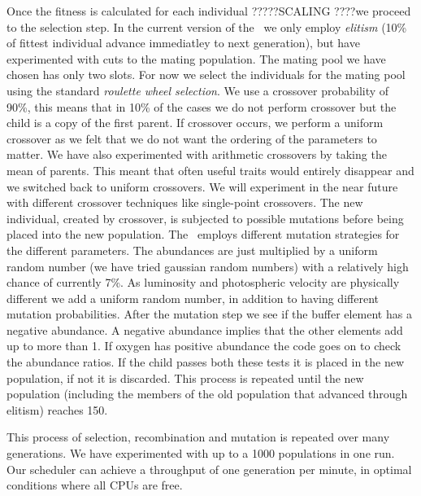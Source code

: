 Once the fitness is calculated for each individual ?????SCALING ????we proceed to the selection step. In the current version of the \dalek\ we only employ \textit{elitism} (10\% of fittest individual advance immediatley to next generation), but have experimented with cuts to the mating population. The mating pool we have chosen has only two slots. For now we select the individuals for the mating pool using the standard \textit{roulette wheel selection}. We use a crossover probability of 90\%, this means that in 10\% of the cases we do not perform crossover but the child is a copy of the first parent. If crossover occurs, we perform a uniform crossover as we felt that we do not want the ordering of the parameters to matter. We have also experimented with arithmetic crossovers by taking the mean of parents. This meant that often useful traits would entirely disappear and we switched back to uniform crossovers. We will experiment in the near future with different crossover techniques like single-point crossovers. The new individual, created by crossover, is subjected to possible mutations before being placed into the new population. The \dalek\ employs different mutation strategies for the different parameters. The abundances are just multiplied by a uniform random number (we have tried gaussian random numbers) with a relatively high chance of currently 7\%. As luminosity and photospheric velocity are physically different we add a uniform random number, in addition to having different mutation probabilities. After the mutation step we see if the buffer element has a negative abundance. A negative abundance implies that the other elements add up to more than 1. If oxygen has positive abundance the code goes on to check the abundance ratios. If the child passes both these tests it is placed in the new population, if not it is discarded. This process is repeated until the new population (including the members of the old population that advanced through elitism) reaches 150.

This process of selection, recombination and mutation is repeated over many generations. We have experimented with up to a 1000 populations in one run. Our scheduler can achieve a throughput of one generation per minute, in optimal conditions where all CPUs are free. 


